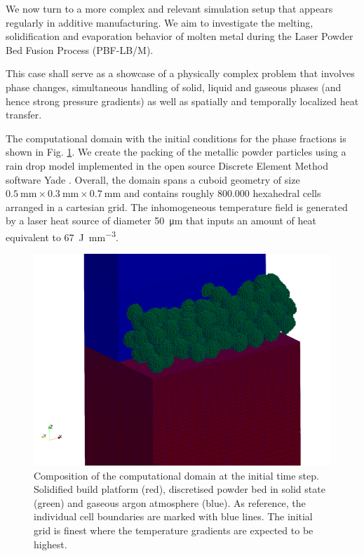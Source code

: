 \documentclass[conference,final,a4paper]{IEEEtran}
\begin{document}
We now turn to a more complex and relevant simulation setup that appears regularly in additive manufacturing. We aim to investigate the melting, solidification and evaporation behavior of molten metal during the Laser Powder Bed Fusion Process (PBF-LB/M).

This case shall serve as a showcase of a physically complex problem that involves phase changes, simultaneous handling of solid, liquid and gaseous phases (and hence strong pressure gradients) as well as spatially and temporally localized heat transfer.

The computational domain with the initial conditions for the phase fractions is shown in Fig. \ref{fig:lpbf-initial}. We create the packing of the metallic powder particles using a rain drop model implemented in the open source Discrete Element Method software Yade \cite{vaclavsmilauerYadeDocumentation2021}. Overall, the domain spans a cuboid geometry of size $\SI{0.5}{\milli\metre} \times \SI{0.3}{\milli\metre} \times \SI{0.7}{\milli\metre}$ and contains roughly 800.000 hexahedral cells arranged in a cartesian grid. The inhomogeneous temperature field is generated by a laser heat source of diameter \SI{50}{\micro\metre} that inputs an amount of heat equivalent to \SI{67}{\joule \per \milli\metre\cubed}.

\begin{figure}[!tbp]
  \centering
  \includegraphics[width=\linewidth]{Figs/powderbed.png}
  \caption{Composition of the computational domain at the initial time step. Solidified build platform (red), discretised powder bed in solid state (green) and gaseous argon atmosphere (blue). As reference, the individual cell boundaries are marked with blue lines. The initial grid is finest where the temperature gradients are expected to be highest.}
  \label{fig:lpbf-initial}
\end{figure}
\end{document}
